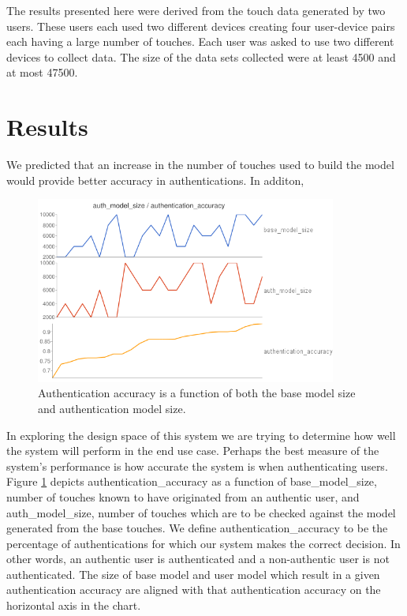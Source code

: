 \documentclass{acm_proc_article-sp}
\begin{document}
The results presented here were derived from the touch data generated by two users. These users each used two different devices creating four user-device pairs each having a large number of touches.
Each user was asked to use two different devices to collect data.
The size of the data sets collected were at least 4500 and at most 47500.



\section{Results}
\label{sec:results}
We predicted that an increase in the number of touches used to build the model would provide better accuracy in authentications. 
In additon, 

\begin{figure}
\centering
\includegraphics[width=3.9in]{authentication_accuracy_vs_model_size.png}
\caption{Authentication accuracy is a function of both the base model size and authentication model size.}
\label{fig:authentication_accuracy}
\end{figure}

%
In exploring the design space of this system we are trying to determine how well the system will perform in the end use case. Perhaps the best measure of the system's performance is how accurate the system is when authenticating users. Figure \ref{fig:authentication_accuracy} depicts authentication\_accuracy as a function of base\_model\_size, number of touches known to have originated from an authentic user, and auth\_model\_size, number of touches which are to be checked against the model generated from the base touches. We define authentication\_accuracy to be the percentage of authentications for which our system makes the correct decision. In other words, an authentic user is authenticated and a non-authentic user is not authenticated. The size of base model and user model which result in a given authentication accuracy are aligned with that authentication accuracy on the horizontal axis in the chart. 
\end{document}
